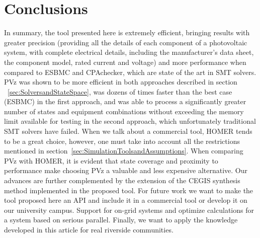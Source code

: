 \documentclass[10pt,journal,compsoc]{IEEEtran}
\begin{document}
\section{Conclusions} 
In summary, the tool presented here is extremely efficient, bringing results with greater precision (providing all the details of each component of a photovoltaic system, with complete electrical details, including the manufacturer's data sheet, the component model, rated current and voltage) and more performance when compared to ESBMC and CPAchecker, which are state of the art in SMT solvers. PVz was shown to be more efficient in both approaches described in section ~\ref{sec:SolversandStateSpace}, was dozens of times faster than the best case (ESBMC) in the first approach, and was able to process a significantly greater number of states and equipment combinations without exceeding the memory limit available for testing in the second approach, which unfortunately traditional SMT solvers have failed. When we talk about a commercial tool, HOMER tends to be a great choice, however, one must take into account all the restrictions mentioned in section~\ref{sec:SimulationToolsandAssumptions}. When comparing PVz with HOMER, it is evident that state coverage and proximity to performance make choosing PVz a valuable and less expensive alternative. Our advances are further complemented by the extension of the CEGIS synthesis method implemented in the proposed tool. For future work we want to make the tool proposed here an API and include it in a commercial tool or develop it on our university campus. Support for on-grid systems and optimize calculations for a system based on serious parallel. Finally, we want to apply the knowledge developed in this article for real riverside communities. \color{black}

%
\end{document}
